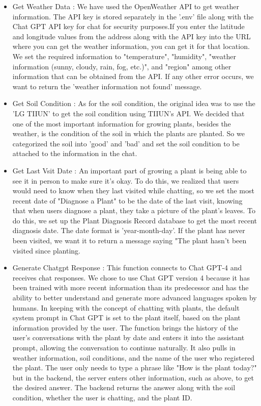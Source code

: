 \documentclass[conference, a4paper]{IEEEtran}
\begin{document}
\begin{enumerate}
\begin{itemize}
\begin{itemize}
\begin{itemize}
            \item Get Weather Data : We have used the OpenWeather API to get weather information. The API key is stored separately in the '.env' file along with the Chat GPT API key for chat for security purposes.If you enter the latitude and longitude values from the address along with the API key into the URL where you can get the weather information, you can get it for that location. We set the required information to "temperature", "humidity", "weather information (sunny, cloudy, rain, fog, etc.)", and "region" among other information that can be obtained from the API. If any other error occurs, we want to return the 'weather information not found' message. \\
            \item Get Soil Condition : As for the soil condition, the original idea was to use the 'LG TIIUN' to get the soil condition using TIIUN's API. We decided that one of the most important information for growing plants, besides the weather, is the condition of the soil in which the plants are planted. So we categorized the soil into 'good' and 'bad' and set the soil condition to be attached to the information in the chat. \\
            \item Get Last Vsit Date : An important part of growing a plant is being able to see it in person to make sure it's okay. To do this, we realized that users would need to know when they last visited while chatting, so we set the most recent date of "Diagnose a Plant" to be the date of the last visit, knowing that when users diagnose a plant, they take a picture of the plant's leaves. To do this, we set up the Plant Diagnosis Record database to get the most recent diagnosis date. The date format is 'year-month-day'. If the plant has never been visited, we want it to return a message saying "The plant hasn't been visited since planting. \\
            \item Generate Chatgpt Response : This function connects to Chat GPT-4 and receives chat responses. We chose to use Chat GPT version 4 because it has been trained with more recent information than its predecessor and has the ability to better understand and generate more advanced languages spoken by humans. In keeping with the concept of chatting with plants, the default system prompt in Chat GPT is set to the plant itself, based on the plant information provided by the user. The function brings the history of the user's conversations with the plant by date and enters it into the assistant prompt, allowing the conversation to continue naturally. It also pulls in weather information, soil conditions, and the name of the user who registered the plant. The user only needs to type a phrase like "How is the plant today?" but in the backend, the server enters other information, such as above, to get the desired answer. The backend returns the answer along with the soil condition, whether the user is chatting, and the plant ID.
        \end{itemize}


\end{itemize}
\end{itemize}
\end{enumerate}
\end{document}
